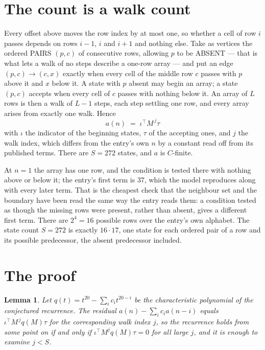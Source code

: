 \documentclass[11pt,a4paper]{article}
\theoremstyle{plain}
\newtheorem{lemma}[theorem]{Lemma}
\theoremstyle{definition}
\begin{document}
\section{The count is a walk count}

Every offset above moves the row index by at most one, so whether a cell of row $i$ passes
depends on rows $i-1$, $i$ and $i+1$ and nothing else. Take as vertices the ordered PAIRS
$(p,c)$ of consecutive rows, allowing $p$ to be ABSENT --- that is what lets a walk of no steps
describe a one-row array --- and put an edge $(p,c)\to(c,x)$ exactly when every cell of the
middle row $c$ passes with $p$ above it and $x$ below it. A state with $p$ absent may begin an
array; a state $(p,c)$ accepts when every cell of $c$ passes with nothing below it. An array of
$L$ rows is then a walk of $L-1$ steps, each step settling one row, and every array arises from
exactly one walk. Hence
\[
a(n)\;=\;\iota^{\!\top}M^{\,j}\tau
\]
with $\iota$ the indicator of the beginning states, $\tau$ of the accepting ones, and $j$ the
walk index, which differs from the entry's own $n$ by a constant read off from its published
terms. There are $S=272$ states, and $a$ is $C$-finite.

At $n=1$ the array has one row, and
the condition is tested there with nothing above or below it; the entry's first term is
$37$, which the model reproduces along with every later term. That is the cheapest check
that the neighbour set and the boundary have been read the same way the entry reads them: a
condition tested as though the missing rows were present, rather than absent, gives a different
first term. There are $2^{4}=16$ possible rows over the entry's own alphabet. The state count $S=272$ is exactly $16\cdot17$,
one state for each ordered pair of a row and its possible predecessor, the absent predecessor
included.

\section{The proof}

\begin{lemma}\label{lem:crit}
Let $q(t)=t^{20}-\sum_i c_it^{20-i}$ be the characteristic polynomial of the
conjectured recurrence. The residual $a(n)-\sum_ic_ia(n-i)$ equals
$\iota^{\!\top}M^{\,j}q(M)\tau$ for the corresponding walk index $j$, so the recurrence
holds from some point on if and only if $\iota^{\!\top}M^{j}q(M)\tau=0$ for all large $j$,
and it is enough to examine $j<S$.
\end{lemma}
\end{document}
